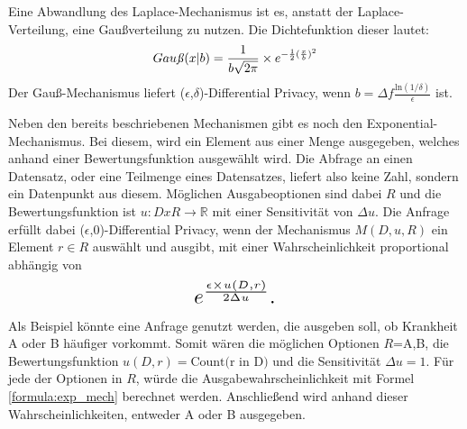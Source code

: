 Eine Abwandlung des Laplace-Mechanismus ist es, anstatt der Laplace-Verteilung, eine Gaußverteilung zu nutzen. Die Dichtefunktion dieser lautet:
\begin{equation}
    Gau\text{\textit{ß}}(x|b) = \frac{1}{b\sqrt{2\pi}}\times e^{-\frac{1}{2}(\frac{x}{b})^2}
\end{equation}
Der Gauß-Mechanismus liefert ($\epsilon$,$\delta$)-Differential Privacy, wenn $b = \Delta f \frac{\text{ln}(1/\delta)}{\epsilon}$ ist.

Neben den bereits beschriebenen Mechanismen gibt es noch den Exponential-Mechanismus. 
Bei diesem, wird ein Element aus einer Menge ausgegeben, welches anhand einer Bewertungsfunktion ausgewählt wird.
Die Abfrage an einen Datensatz, oder eine Teilmenge eines Datensatzes, liefert also keine Zahl, sondern ein Datenpunkt aus diesem.
Möglichen Ausgabeoptionen sind dabei $R$ und die Bewertungsfunktion ist $u:D x R \xrightarrow{} \mathbb{R}$ mit einer Sensitivität von $\Delta u$.
Die Anfrage erfüllt dabei ($\epsilon$,0)-Differential Privacy, wenn der Mechanismus $M(D,u,R)$ ein Element $r \in R$ auswählt und ausgibt, mit einer Wahrscheinlichkeit proportional abhängig von
\begin{equation}\label{formula:exp_mech}
\resizebox{0.9in}{!}{$
    e^{\frac{\epsilon \times u(D,r)}{2\Delta u}}.
$}
\end{equation}
Als Beispiel könnte eine Anfrage genutzt werden, die ausgeben soll, ob Krankheit A oder B häufiger vorkommt.
Somit wären die möglichen Optionen $R$={A,B}, die Bewertungsfunktion $u(D,r)=\text{Count(r in D)}$ und die Sensitivität $\Delta u = 1$. 
Für jede der Optionen in $R$, würde die Ausgabewahrscheinlichkeit mit Formel \ref{formula:exp_mech} berechnet werden. 
Anschließend wird anhand dieser Wahrscheinlichkeiten, entweder A oder B ausgegeben.

